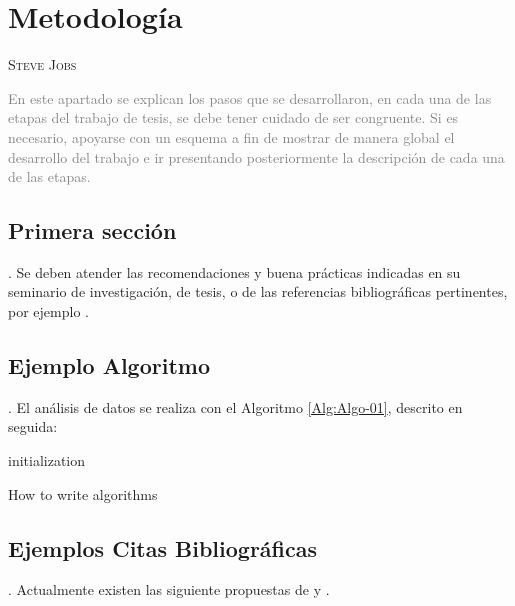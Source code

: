 \chapter{Metodología}
              {\textsc{Steve Jobs}}
              
\textcolor{gray}{En este apartado se explican los pasos que se desarrollaron, en cada una de las etapas del trabajo de tesis, se debe tener cuidado de ser congruente. Si es necesario, apoyarse con un esquema a fin de mostrar de manera global el desarrollo del trabajo e ir presentando posteriormente la descripción de cada una de las etapas.}

\section{Primera sección}
\lipsum[1-2]. 
Se deben atender las recomendaciones y buena prácticas indicadas en su seminario de investigación, de tesis, o de
las referencias bibliográficas pertinentes, por ejemplo \cite{Sampieri}. 

\section{Ejemplo Algoritmo}
\lipsum[3]
\lipsum[4].
El análisis de datos se realiza con el Algoritmo \ref{Alg:Algo-01}, descrito en seguida:

\begin{algorithm}[H]
  \SetAlgoLined
  initialization\;
  \caption{How to write algorithms}
  \label{Alg:Algo-01}
\end{algorithm}

\section{Ejemplos Citas Bibliográficas}
\lipsum[1-2].
Actualmente existen las siguiente propuestas de \cite{lopez2013impacto} y \cite{orduna2016revolucion}.


